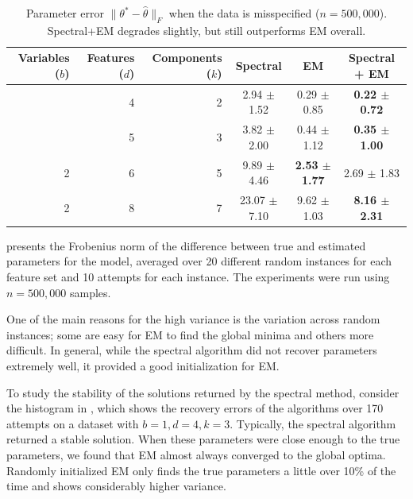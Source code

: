 \begin{table}[tbhp]
\caption{Parameter error $\|\theta^* - \hat \theta\|_F$ when the data is misspecified ($n = 500,000$).
Spectral+EM degrades slightly, but still outperforms EM overall.
}
\label{tbl:parameter-recovery-mis}
\vskip 0.15in
\begin{center}
\begin{small}
\begin{sc}

  \begin{tabular}{ r r r c c c }
\hline
\abovespace\belowspace
Variables ($b$) & Features ($d$) & Components ($k$) & Spectral & EM & Spectral + EM \\
\hline
\abovespace
 1 & 4 & 2 &  2.94 $\pm$ 1.52 & 0.29 $\pm$ 0.85 &  {\bf 0.22 $\pm$ 0.72} \\
\belowspace
 2 & 5 & 3 &  3.82 $\pm$ 2.00 & 0.44 $\pm$ 1.12 &  {\bf 0.35 $\pm$ 1.00} \\
 2 & 6 & 5 &  9.89 $\pm$ 4.46 & {\bf 2.53 $\pm$ 1.77} &  2.69 $\pm$ 1.83 \\
 2 & 8 & 7 & 23.07 $\pm$ 7.10 & 9.62 $\pm$ 1.03 &  {\bf 8.16 $\pm$ 2.31}  \\
\hline

\end{tabular}
\end{sc}
\end{small}
\end{center}
\vskip -0.1in
\end{table}


 presents the Frobenius norm of the
difference between true and estimated parameters for the model, averaged
over 20 different random instances for each feature set and 10 attempts
for each instance. The experiments were run using $n = 500,000$ samples.

One of the main reasons for the high variance is the variation across
random instances; some are easy for EM to find the global minima and
others more difficult. In general, while the spectral algorithm did not
recover parameters extremely well, it provided a good initialization for
EM.

To study the stability of the solutions returned by the spectral method,
consider the histogram in , which shows the recovery
errors of the algorithms over 170 attempts on a dataset with $b = 1, d = 4,
k = 3$. Typically, the spectral algorithm returned a stable solution.
When these parameters were close enough to the true parameters, we found
that EM almost always converged to the global optima. Randomly
initialized EM only finds the true parameters a little over 10\% of the
time and shows considerably higher variance. 

